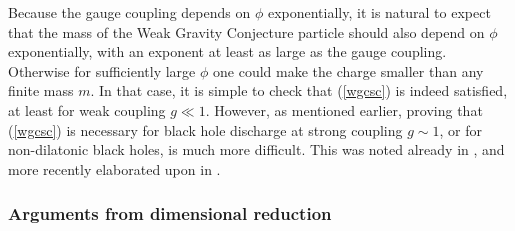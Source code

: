 \documentclass[11pt,a4paper]{article}
\numberwithin{equation}{section}
\numberwithin{table}{section}\setlength{\multlinegap}{25pt}
\begin{document}
Because the gauge coupling depends on $\phi$ exponentially, it is natural to expect that the mass of the Weak Gravity Conjecture particle should also depend on $\phi$ exponentially, with an exponent at least as large as the gauge coupling. Otherwise for sufficiently large $\phi$ one could make the charge smaller than any finite mass $m$. In that case, it is simple to check that (\ref{wgcsc}) is indeed satisfied, at least for weak coupling $g \ll 1$. However, as mentioned earlier, proving that (\ref{wgcsc}) is necessary for black hole discharge at strong coupling $g \sim 1$, or for non-dilatonic black holes, is much more difficult. This was noted already in \cite{Palti:2017elp}, and more recently elaborated upon in \cite{Lee:2018spm}.

\subsubsection*{Arguments from dimensional reduction}
\end{document}
